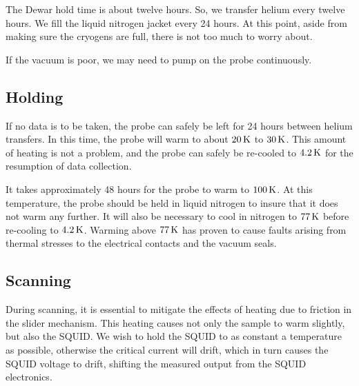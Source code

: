 The Dewar hold time is about twelve hours. So, we transfer helium every
twelve hours. We fill the 
liquid nitrogen jacket every 
24 hours. At this point, 
aside from making sure the cryogens are full, there is not
too much to worry about. 

If the vacuum is poor, we may need to pump on the probe 
continuously. 

\subsection{Holding}

If no data is to be taken, the probe can safely be left for 24 hours
between helium transfers. In this time, the probe will warm to 
about $20\,\kelvin$ to $30\,\kelvin$. 
This amount of heating is not a problem, and the 
probe can safely be re-cooled to $4.2\,\kelvin$ for the resumption of data
collection.

It takes approximately 48 hours for the probe to warm to $100\,\kelvin$. 
At this
temperature, the probe should be held in liquid nitrogen to 
insure that it does
not warm any further. It will also be necessary to cool in nitrogen to 
$77\,\kelvin$ before re-cooling to $4.2\,\kelvin$. 
Warming above $77\,\kelvin$ has proven to cause faults
arising from 
thermal stresses to the electrical contacts and the 
vacuum seals. 

\subsection{Scanning}

During scanning, it is essential to mitigate the effects of heating
due to friction in the slider mechanism. This heating causes not only
the sample to warm slightly, but also the SQUID. 
We wish to hold the SQUID to 
as constant a temperature as possible, otherwise the 
critical current will drift, which in turn causes the SQUID voltage
to drift, shifting the measured output from the SQUID electronics.


%
%

